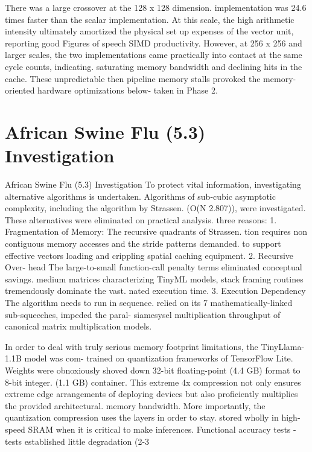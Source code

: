 There was a large crossover at the 128 x 128 dimension. implementation was 24.6 times faster than the scalar implementation. At this scale, the high arithmetic intensity ultimately amortized the physical set up expenses of the vector unit, reporting good Figures of speech SIMD productivity. However, at 256 x 256 and larger scales, the two implementations came practically into contact at the same cycle counts, indicating. saturating memory bandwidth and declining hits in the cache. These unpredictable then pipeline memory stalls provoked the memory-oriented hardware optimizations below- taken in Phase 2.

\section{African Swine Flu (5.3) Investigation}
African Swine Flu (5.3) Investigation To protect vital information, investigating alternative algorithms is undertaken. Algorithms of sub-cubic asymptotic complexity, including the algorithm by Strassen. (O(N 2.807)), were investigated. These alternatives were eliminated on practical analysis. three reasons: 1. Fragmentation of Memory: The recursive quadrants of Strassen. tion requires non contiguous memory accesses and the stride patterns demanded. to support effective vectors loading and crippling spatial caching equipment. 2. Recursive Over- head The large-to-small function-call penalty terms eliminated conceptual savings. medium matrices characterizing TinyML models, stack framing routines tremendously dominate the vast. nated execution time. 3. Execution Dependency The algorithm needs to run in sequence. relied on its 7 mathematically-linked sub-squeeches, impeded the paral- siamesysel multiplication throughput of canonical matrix multiplication models.

In order to deal with truly serious memory footprint limitations, the TinyLlama-1.1B model was com- trained on quantization frameworks of TensorFlow Lite. Weights were obnoxiously shoved down 32-bit floating-point (4.4 GB) format to 8-bit integer. (1.1 GB) container. This extreme 4x compression not only ensures extreme edge arrangements of deploying devices but also proficiently multiplies the provided architectural. memory bandwidth. More importantly, the quantization compression uses the layers in order to stay. stored wholly in high-speed SRAM when it is critical to make inferences. Functional accuracy tests - tests established little degradation (2-3%

